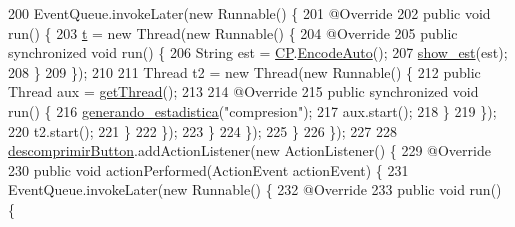 \begin{DoxyCode}
200                         EventQueue.invokeLater(\textcolor{keyword}{new} Runnable() \{
201                             @Override
202                             \textcolor{keyword}{public} \textcolor{keywordtype}{void} run() \{
203                                 \hyperlink{classpresentacion_1_1form_1_1mainForm_a4643a7a227b8b65874d63d33a5adfc33}{t} = \textcolor{keyword}{new} Thread(\textcolor{keyword}{new} Runnable() \{
204                                     @Override
205                                     \textcolor{keyword}{public} \textcolor{keyword}{synchronized} \textcolor{keywordtype}{void} run() \{
206                                         String est = \hyperlink{classpresentacion_1_1form_1_1mainForm_a4d01396f002d4f9bd18db3877057c77b}{CP}.\hyperlink{classpresentacion_1_1Ctrl__Presentacio_1_1Ctrl__Presentacio_a3c70338349a2890f5191162b22ee78dc}{EncodeAuto}();
207                                         \hyperlink{classpresentacion_1_1form_1_1mainForm_a6eb9e9b4f7bb6da2c592a5a0294a6a06}{show\_est}(est);
208                                     \}
209                                 \});
210 
211                                 Thread t2 = \textcolor{keyword}{new} Thread(\textcolor{keyword}{new} Runnable() \{
212                                     \textcolor{keyword}{public} Thread aux = \hyperlink{classpresentacion_1_1form_1_1mainForm_ac6348f8bdef39bfa651f145c00664320}{getThread}();
213 
214                                     @Override
215                                     \textcolor{keyword}{public} \textcolor{keyword}{synchronized} \textcolor{keywordtype}{void} run() \{
216                                         \hyperlink{classpresentacion_1_1form_1_1mainForm_a34580a4b6e2c162d35ab5502f0ac7e4c}{generando\_estadistica}(\textcolor{stringliteral}{"compresion"});
217                                         aux.start();
218                                     \}
219                                 \});
220                                 t2.start();
221                             \}
222                         \});
223                     \}
224                 \});
225             \}
226         \});
227 
228         \hyperlink{classpresentacion_1_1form_1_1mainForm_a336e6855f8a19241d02376d4ff6a1802}{descomprimirButton}.addActionListener(\textcolor{keyword}{new} ActionListener() \{
229             @Override
230             \textcolor{keyword}{public} \textcolor{keywordtype}{void} actionPerformed(ActionEvent actionEvent) \{
231                 EventQueue.invokeLater(\textcolor{keyword}{new} Runnable() \{
232                     @Override
233                     \textcolor{keyword}{public} \textcolor{keywordtype}{void} run() \{

\end{DoxyCode}
